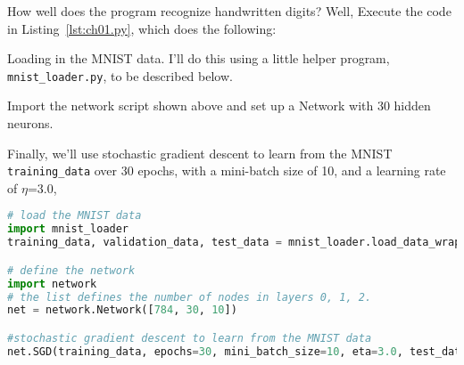 How well does the program recognize handwritten digits? Well,  Execute the code in Listing~\ref{lst:ch01.py}, which does the following:


Loading in the MNIST data. I'll do this using a little helper program, \lstinline{mnist_loader.py}, to be described below.

Import the network script shown above and set up a Network with 30 hidden neurons.

Finally, we'll use stochastic gradient descent to learn from the MNIST \lstinline{training_data} over 30 epochs, with a mini-batch size of 10, and a learning rate of $\eta$=3.0, 

\begin{fullwidth}
\begin{lstlisting}[caption={ch01.py (Python 3.7.1)},label={lst:ch01.py}, language=Python]
# load the MNIST data
import mnist_loader
training_data, validation_data, test_data = mnist_loader.load_data_wrapper()

# define the network
import network
# the list defines the number of nodes in layers 0, 1, 2.
net = network.Network([784, 30, 10])

#stochastic gradient descent to learn from the MNIST data
net.SGD(training_data, epochs=30, mini_batch_size=10, eta=3.0, test_data=test_data)

\end{lstlisting}
\end{fullwidth}

